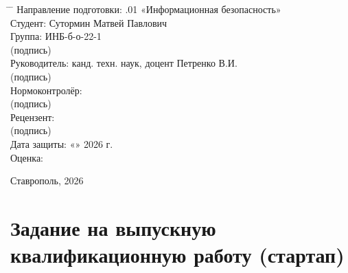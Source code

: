 \documentclass[14pt,a4paper]{extarticle}
\begin{document}
\begin{titlepage}
\begin{tabbing}
\hspace{7cm} \= \hspace{4cm} \= \kill
Направление подготовки: .01 «Информационная безопасность» \\[0.4cm]
Студент: \> Сутормин Матвей Павлович \\[0.1cm]
Группа: \> ИНБ-б-о-22-1 \\[0.1cm]
\> \underline{\hspace{4cm}} (подпись) \\[0.4cm]
Руководитель: \> канд. техн. наук, доцент Петренко В.И. \\[0.1cm]
\> \underline{\hspace{4cm}} (подпись) \\[0.4cm]
Нормоконтролёр: \> \underline{\hspace{4cm}} \\[0.1cm]
\> \underline{\hspace{4cm}} (подпись) \\[0.4cm]
Рецензент: \> \underline{\hspace{4cm}} \\[0.1cm]
\> \underline{\hspace{4cm}} (подпись) \\[0.4cm]
Дата защиты: \> «\underline{\hspace{0.7cm}}» \underline{\hspace{2.5cm}} 2026 г. \\[0.2cm]
Оценка: \> \underline{\hspace{4cm}} \\
\end{tabbing}

\vfill

\begin{center}
Ставрополь, 2026
\end{center}
\end{titlepage}

\clearpage
\hypertarget{ux437ux430ux434ux430ux43dux438ux435-ux43dux430-ux432ux44bux43fux443ux441ux43aux43dux443ux44e-ux43aux432ux430ux43bux438ux444ux438ux43aux430ux446ux438ux43eux43dux43dux443ux44e-ux440ux430ux431ux43eux442ux443-ux441ux442ux430ux440ux442ux430ux43f}{%
\section{Задание на выпускную квалификационную работу (стартап)}\label{ux437ux430ux434ux430ux43dux438ux435-ux43dux430-ux432ux44bux43fux443ux441ux43aux43dux443ux44e-ux43aux432ux430ux43bux438ux444ux438ux43aux430ux446ux438ux43eux43dux43dux443ux44e-ux440ux430ux431ux43eux442ux443-ux441ux442ux430ux440ux442ux430ux43f}}
\end{document}
